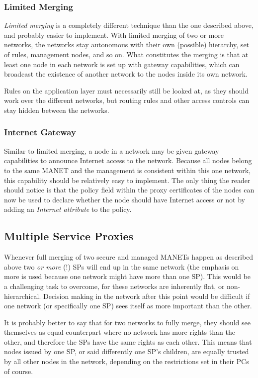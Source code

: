 \subsubsection*{Limited Merging}
\emph{Limited merging} is a completely different technique than the one
described above, and probably easier to implement. With limited merging of two
or more networks, the networks stay autonomous with their own (possible)
hierarchy, set of rules, management nodes, and so on. What constitutes the
merging is that at least one node in each network is set up with gateway
capabilities, which can broadcast the existence of another network to the nodes
inside its own network.

Rules on the application layer must necessarily still be looked at, as they
should work over the different networks, but routing rules and other access
controls can stay hidden between the networks.

\subsubsection*{Internet Gateway}
Similar to limited merging, a node in a network may be given gateway capabilities
to announce Internet access to the network. Because all nodes belong to the same
\ac{MANET} and the management is consistent within this one network, this
capability should be relatively easy to implement. The only thing the reader
should notice is that the policy field within the proxy certificates of the
nodes can now be used to declare whether the node should have Internet access or
not by adding an \emph{Internet attribute} to the policy.

\subsection{Multiple Service Proxies}
Whenever full merging of two secure and managed MANETs happen as described above
two \emph{or more} (!) SPs will end up in the same network (the emphasis on more
is used because one network might have more than one SP). This would be a
challenging task to overcome, for these networks are inherently flat, or
non-hierarchical. Decision making in the network after this point would be
difficult if one network (or specifically one SP) sees itself as more important
than the other.

It is probably better to say that for two networks to fully merge, they should
see themselves as equal counterpart where no network has more rights than the
other, and therefore the \acp{SP} have the same rights as each other. This means
that nodes issued by one \ac{SP}, or said differently one SP's children, are
equally trusted by all other nodes in the network, depending on the restrictions
set in their \acp{PC} of course.

